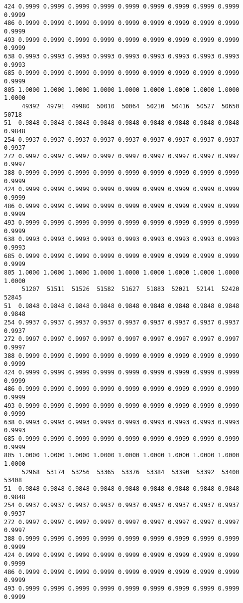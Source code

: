 \documentclass[
]{report}
\begin{document}
\begin{verbatim}
424 0.9999 0.9999 0.9999 0.9999 0.9999 0.9999 0.9999 0.9999 0.9999 0.9999
486 0.9999 0.9999 0.9999 0.9999 0.9999 0.9999 0.9999 0.9999 0.9999 0.9999
493 0.9999 0.9999 0.9999 0.9999 0.9999 0.9999 0.9999 0.9999 0.9999 0.9999
638 0.9993 0.9993 0.9993 0.9993 0.9993 0.9993 0.9993 0.9993 0.9993 0.9993
685 0.9999 0.9999 0.9999 0.9999 0.9999 0.9999 0.9999 0.9999 0.9999 0.9999
805 1.0000 1.0000 1.0000 1.0000 1.0000 1.0000 1.0000 1.0000 1.0000 1.0000
     49392  49791  49980  50010  50064  50210  50416  50527  50650  50718
51  0.9848 0.9848 0.9848 0.9848 0.9848 0.9848 0.9848 0.9848 0.9848 0.9848
254 0.9937 0.9937 0.9937 0.9937 0.9937 0.9937 0.9937 0.9937 0.9937 0.9937
272 0.9997 0.9997 0.9997 0.9997 0.9997 0.9997 0.9997 0.9997 0.9997 0.9997
388 0.9999 0.9999 0.9999 0.9999 0.9999 0.9999 0.9999 0.9999 0.9999 0.9999
424 0.9999 0.9999 0.9999 0.9999 0.9999 0.9999 0.9999 0.9999 0.9999 0.9999
486 0.9999 0.9999 0.9999 0.9999 0.9999 0.9999 0.9999 0.9999 0.9999 0.9999
493 0.9999 0.9999 0.9999 0.9999 0.9999 0.9999 0.9999 0.9999 0.9999 0.9999
638 0.9993 0.9993 0.9993 0.9993 0.9993 0.9993 0.9993 0.9993 0.9993 0.9993
685 0.9999 0.9999 0.9999 0.9999 0.9999 0.9999 0.9999 0.9999 0.9999 0.9999
805 1.0000 1.0000 1.0000 1.0000 1.0000 1.0000 1.0000 1.0000 1.0000 1.0000
     51207  51511  51526  51582  51627  51883  52021  52141  52420  52845
51  0.9848 0.9848 0.9848 0.9848 0.9848 0.9848 0.9848 0.9848 0.9848 0.9848
254 0.9937 0.9937 0.9937 0.9937 0.9937 0.9937 0.9937 0.9937 0.9937 0.9937
272 0.9997 0.9997 0.9997 0.9997 0.9997 0.9997 0.9997 0.9997 0.9997 0.9997
388 0.9999 0.9999 0.9999 0.9999 0.9999 0.9999 0.9999 0.9999 0.9999 0.9999
424 0.9999 0.9999 0.9999 0.9999 0.9999 0.9999 0.9999 0.9999 0.9999 0.9999
486 0.9999 0.9999 0.9999 0.9999 0.9999 0.9999 0.9999 0.9999 0.9999 0.9999
493 0.9999 0.9999 0.9999 0.9999 0.9999 0.9999 0.9999 0.9999 0.9999 0.9999
638 0.9993 0.9993 0.9993 0.9993 0.9993 0.9993 0.9993 0.9993 0.9993 0.9993
685 0.9999 0.9999 0.9999 0.9999 0.9999 0.9999 0.9999 0.9999 0.9999 0.9999
805 1.0000 1.0000 1.0000 1.0000 1.0000 1.0000 1.0000 1.0000 1.0000 1.0000
     52968  53174  53256  53365  53376  53384  53390  53392  53400  53408
51  0.9848 0.9848 0.9848 0.9848 0.9848 0.9848 0.9848 0.9848 0.9848 0.9848
254 0.9937 0.9937 0.9937 0.9937 0.9937 0.9937 0.9937 0.9937 0.9937 0.9937
272 0.9997 0.9997 0.9997 0.9997 0.9997 0.9997 0.9997 0.9997 0.9997 0.9997
388 0.9999 0.9999 0.9999 0.9999 0.9999 0.9999 0.9999 0.9999 0.9999 0.9999
424 0.9999 0.9999 0.9999 0.9999 0.9999 0.9999 0.9999 0.9999 0.9999 0.9999
486 0.9999 0.9999 0.9999 0.9999 0.9999 0.9999 0.9999 0.9999 0.9999 0.9999
493 0.9999 0.9999 0.9999 0.9999 0.9999 0.9999 0.9999 0.9999 0.9999 0.9999

\end{verbatim}
\end{document}
